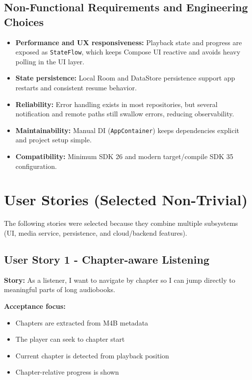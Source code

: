 \documentclass[11pt,a4paper]{article}
\begin{document}
\subsection{Non-Functional Requirements and Engineering Choices}

\begin{itemize}[noitemsep]
    \item \textbf{Performance and UX responsiveness:} Playback state and progress are exposed as \texttt{StateFlow}, which keeps Compose UI reactive and avoids heavy polling in the UI layer.
    \item \textbf{State persistence:} Local Room and DataStore persistence support app restarts and consistent resume behavior.
    \item \textbf{Reliability:} Error handling exists in most repositories, but several notification and remote paths still swallow errors, reducing observability.
    \item \textbf{Maintainability:} Manual DI (\texttt{AppContainer}) keeps dependencies explicit and project setup simple.
    \item \textbf{Compatibility:} Minimum SDK 26 and modern target/compile SDK 35 configuration.
\end{itemize}

\section{User Stories (Selected Non-Trivial)}

The following stories were selected because they combine multiple subsystems (UI, media service, persistence, and cloud/backend features).

\subsection{User Story 1 - Chapter-aware Listening}

\textbf{Story:} As a listener, I want to navigate by chapter so I can jump directly to meaningful parts of long audiobooks.

\textbf{Acceptance focus:}
\begin{itemize}[noitemsep]
    \item Chapters are extracted from M4B metadata
    \item The player can seek to chapter start
    \item Current chapter is detected from playback position
    \item Chapter-relative progress is shown
\end{itemize}
\end{document}
